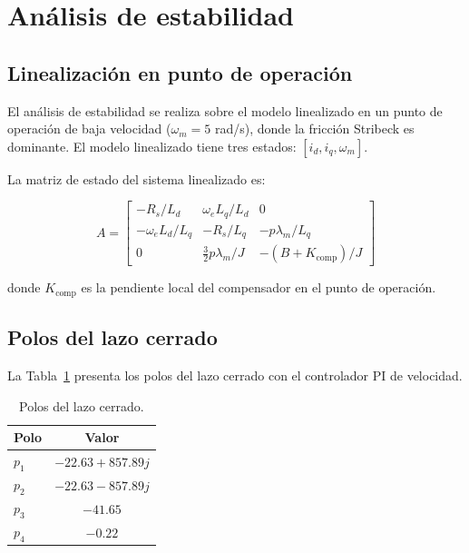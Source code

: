 \section{Análisis de estabilidad}
\label{sec:cap5_estabilidad}

\subsection{Linealización en punto de operación}
\label{subsec:cap5_linealizacion}

El análisis de estabilidad se realiza sobre el modelo linealizado en un punto de operación de baja velocidad ($\omega_m = 5$ rad/s), donde la fricción Stribeck es dominante. El modelo linealizado tiene tres estados: $[i_d, i_q, \omega_m]$.

La matriz de estado del sistema linealizado es:

\begin{equation}
A = \begin{bmatrix}
-R_s/L_d & \omega_e L_q/L_d & 0 \\
-\omega_e L_d/L_q & -R_s/L_q & -p\lambda_m/L_q \\
0 & \frac{3}{2}p\lambda_m/J & -(B+K_{\text{comp}})/J
\end{bmatrix}
\label{eq:cap5_matriz_A}
\end{equation}

donde $K_{\text{comp}}$ es la pendiente local del compensador en el punto de operación.

\subsection{Polos del lazo cerrado}
\label{subsec:cap5_polos}

La Tabla~\ref{tab:cap5_polos} presenta los polos del lazo cerrado con el controlador PI de velocidad.

\begin{table}[H]
\centering
\caption{Polos del lazo cerrado.}
\label{tab:cap5_polos}
\small
\begin{tabular}{@{}lc@{}}
\toprule
\textbf{Polo} & \textbf{Valor} \\
\midrule
$p_1$ & $-22.63 + 857.89j$ \\
$p_2$ & $-22.63 - 857.89j$ \\
$p_3$ & $-41.65$ \\
$p_4$ & $-0.22$ \\
\bottomrule
\end{tabular}
\end{table}

